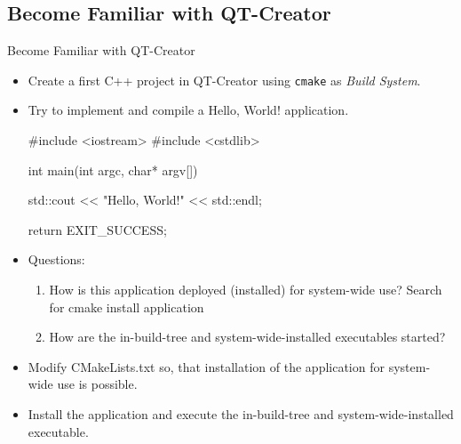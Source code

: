 \subsection{Become Familiar with QT-Creator}

\begin{frame}[fragile]{Become Familiar with QT-Creator}
  \begin{itemize}
    \item Create a first C++ project in QT-Creator using \texttt{cmake} as {\em Build System}.
    \item Try to implement and compile a \textcolor{fh-ooe-red}{Hello, World!} application.
    \begin{cppcode}[gobble=6]
      #include <iostream>
      #include <cstdlib>

      int main(int argc, char* argv[]) {
        std::cout << "Hello, World!" << std::endl;

        return EXIT_SUCCESS;
      }
    \end{cppcode}
    \item Questions:
    \begin{enumerate}
      \item How is this application deployed (installed) for system-wide use? Search for \textcolor{fh-ooe-red}{cmake install application}
      \item How are the in-build-tree and system-wide-installed executables started?
    \end{enumerate}
    \item Modify \textcolor{fh-ooe-red}{CMakeLists.txt} so, that installation of the application for system-wide use is possible.
    \item Install the application and execute the in-build-tree and system-wide-installed executable.
  \end{itemize}
\end{frame}
